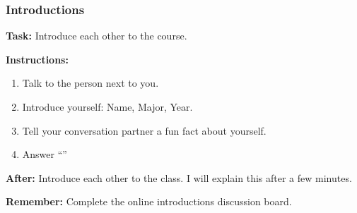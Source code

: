 \begin{frame}
  \frametitle{Introductions}

  \textbf{Task:} Introduce each other to the course.

  \vspace{0.5em}
  
  \textbf{Instructions:}

  \begin{enumerate}
  \item Talk to the person next to you.
  \item Introduce yourself: Name, Major, Year.
  \item Tell your conversation partner a fun fact about yourself.
  \item Answer ``\introq''
  \end{enumerate}

  \vspace{0.5em}
  
  \textbf{After:} Introduce each other to the class.
  I will explain this after a few minutes.

  \textbf{Remember:} Complete the online introductions discussion board.

\end{frame}

